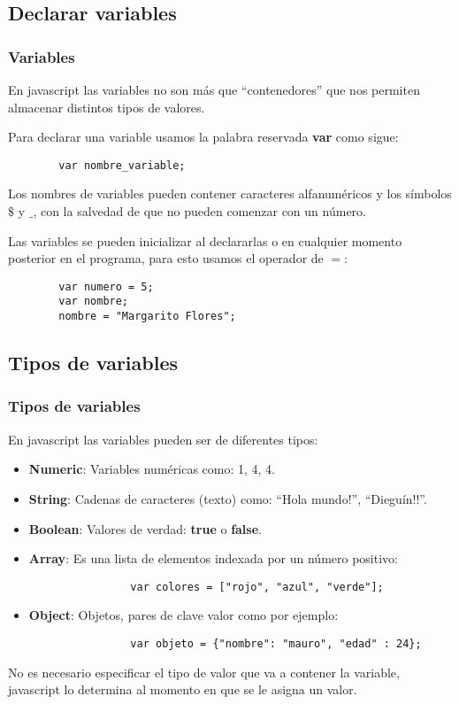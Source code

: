 \documentclass[handout, 10pt]{beamer}
\begin{document}
\subsection{Declarar variables}
\begin{frame}[fragile]
	\frametitle{Variables}
	En javascript las variables no son más que ``contenedores'' que nos permiten almacenar distintos tipos de valores.
	
	\pause
	
	Para declarar una variable usamos la palabra reservada \textbf{var} como sigue:
	
	\begin{lstlisting}
		var nombre_variable;
	\end{lstlisting}
	
	\pause
	
	Los nombres de variables pueden contener caracteres alfanuméricos y los símbolos $\$$ y $\_$, con la salvedad
	de que no pueden comenzar con un número.
	
	\pause
	
	Las variables se pueden inicializar al declararlas o en cualquier momento posterior en el programa, para esto
	usamos el operador de $=$:
	\begin{lstlisting}
		var numero = 5;
		var nombre;
		nombre = "Margarito Flores";
	\end{lstlisting}
	
\end{frame}

\subsection{Tipos de variables}
\begin{frame}[fragile]
	\frametitle{Tipos de variables}
	En javascript las variables pueden ser de diferentes tipos: 
	\begin{itemize}
		\pause \item \textbf{Numeric}: Variables numéricas como: 1, 4, 4.
		\pause \item \textbf{String}: Cadenas de caracteres (texto) como: ``Hola mundo!'', ``Dieguín!!''.
		\pause \item \textbf{Boolean}: Valores de verdad: \textbf{true} o \textbf{false}.
		\pause \item \textbf{Array}: Es una lista de elementos indexada por un número positivo:
			\begin{lstlisting}
				var colores = ["rojo", "azul", "verde"];
			\end{lstlisting}
			
		\pause \item \textbf{Object}: Objetos, pares de clave valor como por ejemplo:
			\begin{lstlisting}
				var objeto = {"nombre": "mauro", "edad" : 24};
			\end{lstlisting}
	\end{itemize}
	
	No es necesario especificar el tipo de valor que va a contener la variable, javascript lo determina
	al momento en que se le asigna un valor.
\end{frame}
\end{document}

